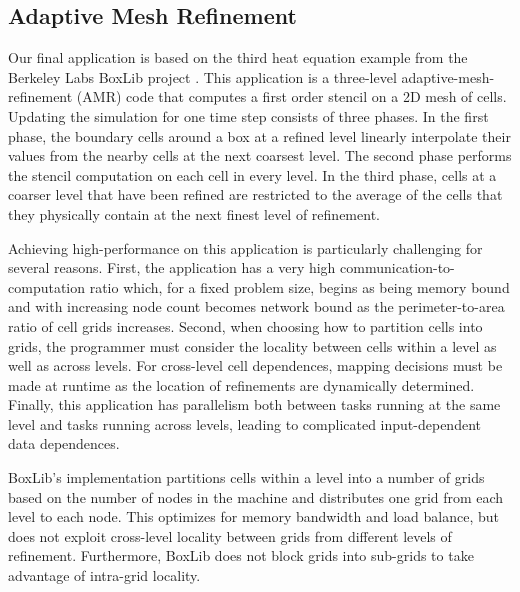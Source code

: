 \subsection{Adaptive Mesh Refinement}
\label{subsec:exp_amr}
Our final application is based on the third heat equation example from
the Berkeley Labs BoxLib project \cite{BoxLib}.  This application is a
three-level adaptive-mesh-refinement (AMR) code that computes a first
order stencil on a 2D mesh of cells.  
Updating the simulation for one time step consists of
three phases.  In the first phase, the boundary cells around a box at
a refined level linearly interpolate their values from the nearby
cells at the next coarsest level.  The second phase performs the
stencil computation on each cell in every level.  In the third phase,
cells at a coarser level that have been refined are restricted to the
average of the cells that they physically contain at the next finest
level of refinement.

Achieving high-performance on this application is particularly
challenging for several reasons.  First, the application has a very
high communication-to-computation ratio which, for a fixed problem
size, begins as being memory bound and with increasing node count
becomes network bound as the perimeter-to-area ratio of cell grids
increases.  Second, when choosing how to partition cells into grids,
the programmer must consider the locality between cells within a
level as well as across levels.  For
cross-level cell dependences, mapping decisions must be made at
runtime as the location of refinements are dynamically determined.
Finally, this application has parallelism both
between tasks running at the same level and tasks running across
levels, leading to complicated input-dependent data dependences.

BoxLib's implementation partitions cells within a level 
into a number of grids based on the number of nodes in the
machine and distributes one grid from each level to each node.  This
optimizes for memory bandwidth and load balance, but does not 
exploit cross-level locality between grids from
different levels of refinement.  Furthermore, BoxLib does not block
grids into sub-grids to take advantage of intra-grid locality.

